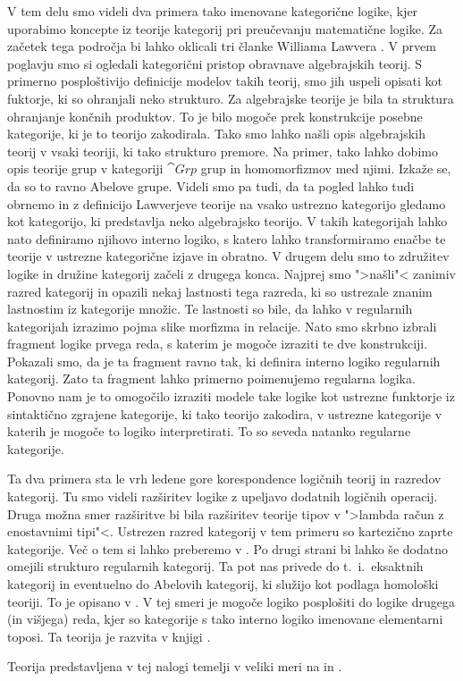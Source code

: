 \documentclass[../kategoricna_logika.tex]{subfiles}
\begin{document}
V tem delu smo videli dva primera tako imenovane kategorične logike, kjer uporabimo
koncepte iz teorije kategorij pri preučevanju matematične logike.
Za začetek tega področja bi lahko oklicali tri članke Williama Lawvera \cite{lawvere1963functorial,lawvere1964elementary,lawvere1971quantifiers}.
V prvem poglavju smo si ogledali kategorični pristop obravnave algebrajskih teorij.
S primerno posploštivijo definicije modelov takih teorij, smo jih uspeli opisati
kot fuktorje, ki so ohranjali neko strukturo.
Za algebrajske teorije je bila ta struktura ohranjanje končnih produktov.
To je bilo mogoče prek konstrukcije posebne kategorije, ki je to teorijo zakodirala.
Tako smo lahko našli opis algebrajskih teorij v vsaki teoriji, ki tako strukturo premore.
Na primer, tako lahko dobimo opis teorije grup v kategoriji $\cat{Grp}$ grup in
homomorfizmov med njimi. Izkaže se, da so to ravno Abelove grupe.
Videli smo pa tudi, da ta pogled lahko tudi obrnemo in z definicijo Lawverjeve teorije
na vsako ustrezno kategorijo gledamo kot kategorijo, ki predstavlja neko algebrajsko
teorijo. V takih kategorijah lahko nato definiramo njihovo interno logiko, s katero
lahko transformiramo enačbe te teorije v ustrezne kategorične izjave in obratno.
V drugem delu smo to združitev logike in družine kategorij začeli z drugega konca.
Najprej smo ">našli"< zanimiv razred kategorij in opazili nekaj lastnosti tega razreda,
ki so ustrezale znanim lastnostim iz kategorije množic. Te lastnosti so bile, da lahko
v regularnih kategorijah izrazimo pojma slike morfizma in relacije. Nato smo skrbno
izbrali fragment logike prvega reda, s katerim je mogoče izraziti te dve konstrukciji.
Pokazali smo, da je ta fragment ravno tak, ki definira interno logiko regularnih kategorij.
Zato ta fragment lahko primerno poimenujemo regularna logika.
Ponovno nam je to omogočilo izraziti modele take logike kot ustrezne funktorje iz sintaktično
zgrajene kategorije, ki tako teorijo zakodira, v ustrezne kategorije v katerih je
mogoče to logiko interpretirati. To so seveda natanko regularne kategorije.

Ta dva primera sta le vrh ledene gore korespondence logičnih teorij in razredov kategorij.
Tu smo videli razširitev logike z upeljavo dodatnih logičnih operacij. Druga možna smer
razširitve bi bila razširitev teorije tipov v ">lambda račun z enostavnimi tipi"<. Ustrezen
razred kategorij v tem primeru so kartezično zaprte kategorije. Več o tem si lahko preberemo
v \cite{seely1984locally}. Po drugi strani bi lahko še dodatno omejili strukturo regularnih
kategorij. Ta pot nas privede do t.\ i.\ eksaktnih kategorij in eventuelno do Abelovih kategorij,
ki služijo kot podlaga homološki teoriji. To je opisano v \cite{barr-exact-categories}.
V tej smeri je mogoče logiko posplošiti do logike drugega (in višjega) reda, kjer so
kategorije s tako interno logiko imenovane elementarni toposi. Ta teorija je razvita v
knjigi \cite{TJohnstone2002-TJOSOA-2}.

Teorija predstavljena v tej nalogi temelji v veliki meri na \cite{algebraic-logic} in \cite{butz1998regular}.
\end{document}

